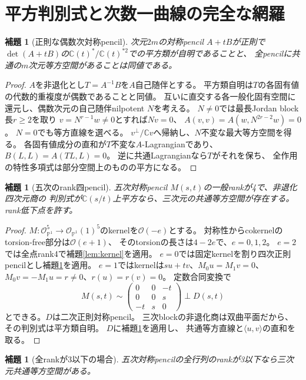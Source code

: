\documentclass[11pt,a4paper]{ltjsarticle}
\newtheorem{lemma}[theorem]{補題}
\newcommand{\CC}{\mathbb C}
\newcommand{\PP}{\mathbb P}
\newcommand{\OO}{\mathcal O}
\begin{document}
\section{平方判別式と次数一曲線の完全な網羅}
\begin{lemma}[正則な偶数次対称pencil]\label{lem:square}
次元$2m$の対称pencil $A+tB$が正則で
$\det(A+tB)$の$\CC(t)^*/\CC(t)^{*2}$での平方類が自明であることと、
全pencilに共通の$m$次元等方空間があることは同値である。
\end{lemma}
\begin{proof}
$A$を非退化とし$T=A^{-1}B$を$A$自己随伴とする。
平方類自明は$T$の各固有値の代数的重複度が偶数であることと同値。
互いに直交する各一般化固有空間に還元し、偶数次元の自己随伴nilpotent $N$を考える。
$N\ne0$では最長Jordan block長$r\ge2$を取り
$v=N^{r-1}w\ne0$とすれば$Nv=0$、
$A(v,v)=A(w,N^{2r-2}w)=0$。
$N=0$でも等方直線を選べる。
$v^\perp/\CC v$へ帰納し、$N$不変な最大等方空間を得る。
各固有値成分の直和が$T$不変な$A$-Lagrangianであり、
$B(L,L)=A(TL,L)=0$。
逆に共通Lagrangianなら$T$がそれを保ち、
全作用の特性多項式は部分空間上のものの平方になる。
\end{proof}
\begin{lemma}[五次のrank四pencil]
五次対称pencil $M(s,t)$の一般rankが4で、非退化四次元商の
判別式が$\CC(s/t)$上平方なら、三次元の共通等方空間が存在する。
rank低下点を許す。
\end{lemma}
\begin{proof}
$M:\OO_{\PP^1}^5\to\OO_{\PP^1}(1)^5$のkernelを$\OO(-e)$とする。
対称性からcokernelのtorsion-free部分は$\OO(e+1)$、
そのtorsionの長さは$4-2e$で、$e=0,1,2$。
$e=2$では全点rank4で補題\ref{lem:kernel}を適用。
$e=0$では固定kernelを割り四次正則pencilとし補題\ref{lem:square}を適用。
$e=1$ではkernelは$su+tv$、$M_0u=M_1v=0$、
$M_0v=-M_1u=r\ne0$、$r(u)=r(v)=0$。
定数合同変換で
\[
 M(s,t)\sim\begin{pmatrix}0&0&-t\\0&0&s\\-t&s&0\end{pmatrix}
 \perp D(s,t)
\]
とできる。$D$は二次正則対称pencil。
三次blockの非退化商は双曲平面だから、その判別式は平方類自明。
$D$に補題\ref{lem:square}を適用し、
共通等方直線と$\langle u,v\rangle$の直和を取る。
\end{proof}
\begin{lemma}[全rankが3以下の場合]
五次対称pencilの全行列のrankが3以下なら三次元共通等方空間がある。
\end{lemma}
\end{document}
